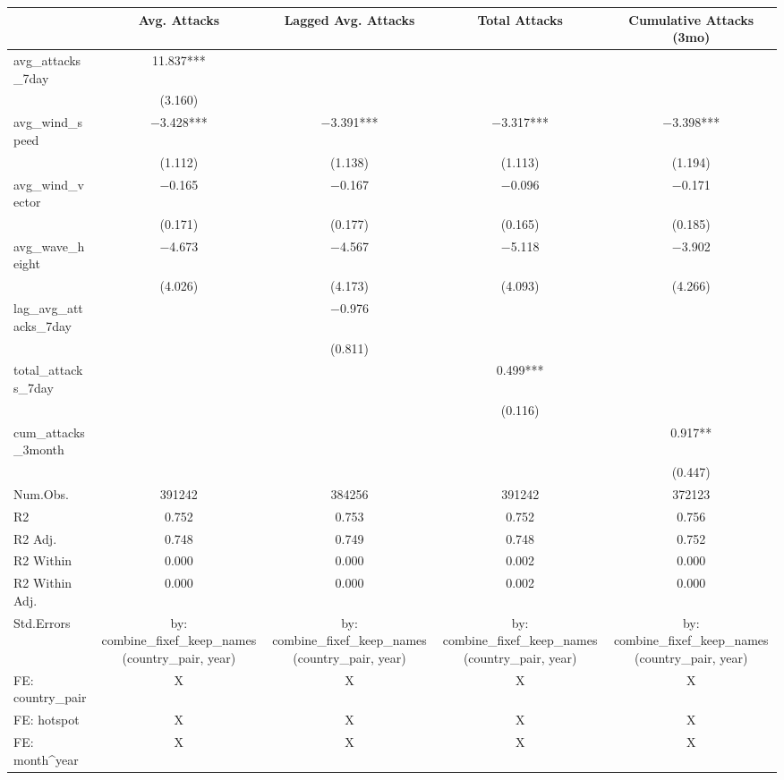 \begin{table}
\centering
\begin{tabular}[t]{lcccc}
\toprule
  & Avg. Attacks & Lagged Avg. Attacks & Total Attacks & Cumulative Attacks (3mo)\\
\midrule
avg\_attacks\_7day & \num{11.837}*** &  &  & \\
 & (\num{3.160}) &  &  & \\
avg\_wind\_speed & \num{-3.428}*** & \num{-3.391}*** & \num{-3.317}*** & \num{-3.398}***\\
 & (\num{1.112}) & (\num{1.138}) & (\num{1.113}) & (\num{1.194})\\
avg\_wind\_vector & \num{-0.165} & \num{-0.167} & \num{-0.096} & \num{-0.171}\\
 & (\num{0.171}) & (\num{0.177}) & (\num{0.165}) & (\num{0.185})\\
avg\_wave\_height & \num{-4.673} & \num{-4.567} & \num{-5.118} & \num{-3.902}\\
 & (\num{4.026}) & (\num{4.173}) & (\num{4.093}) & (\num{4.266})\\
lag\_avg\_attacks\_7day &  & \num{-0.976} &  & \\
 &  & (\num{0.811}) &  & \\
total\_attacks\_7day &  &  & \num{0.499}*** & \\
 &  &  & (\num{0.116}) & \\
cum\_attacks\_3month &  &  &  & \num{0.917}**\\
 &  &  &  & (\num{0.447})\\
\midrule
Num.Obs. & \num{391242} & \num{384256} & \num{391242} & \num{372123}\\
R2 & \num{0.752} & \num{0.753} & \num{0.752} & \num{0.756}\\
R2 Adj. & \num{0.748} & \num{0.749} & \num{0.748} & \num{0.752}\\
R2 Within & \num{0.000} & \num{0.000} & \num{0.002} & \num{0.000}\\
R2 Within Adj. & \num{0.000} & \num{0.000} & \num{0.002} & \num{0.000}\\
Std.Errors & by: combine\_fixef\_keep\_names(country\_pair, year) & by: combine\_fixef\_keep\_names(country\_pair, year) & by: combine\_fixef\_keep\_names(country\_pair, year) & by: combine\_fixef\_keep\_names(country\_pair, year)\\
FE: country_pair & X & X & X & X\\
FE: hotspot & X & X & X & X\\
FE: month^year & X & X & X & X\\

\end{tabular}
\end{table}
